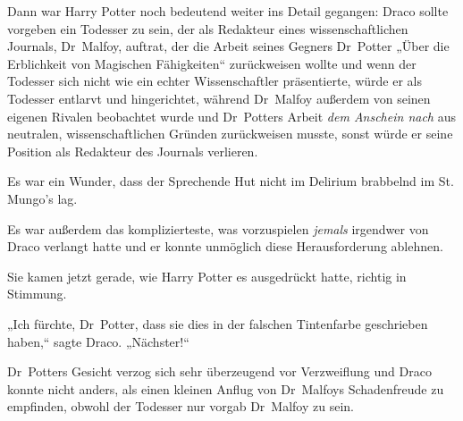 Dann war Harry Potter noch bedeutend weiter ins Detail gegangen: Draco sollte vorgeben ein Todesser zu sein, der als Redakteur eines wissenschaftlichen Journals, Dr~Malfoy, auftrat, der die Arbeit seines Gegners Dr~Potter „Über die Erblichkeit von Magischen Fähigkeiten“ zurückweisen wollte und wenn der Todesser sich nicht wie ein echter Wissenschaftler präsentierte, würde er als Todesser entlarvt und hingerichtet, während Dr~Malfoy außerdem von seinen eigenen Rivalen beobachtet wurde und Dr~Potters Arbeit \emph{dem Anschein nach} aus neutralen, wissenschaftlichen Gründen zurückweisen musste, sonst würde er seine Position als Redakteur des Journals verlieren.

Es war ein Wunder, dass der Sprechende Hut nicht im Delirium brabbelnd im St. Mungo's lag.

Es war außerdem das komplizierteste, was vorzuspielen \emph{jemals} irgendwer von Draco verlangt hatte und er konnte unmöglich diese Herausforderung ablehnen.

Sie kamen jetzt gerade, wie Harry Potter es ausgedrückt hatte, richtig in Stimmung.

„Ich fürchte, Dr~Potter, dass sie dies in der falschen Tintenfarbe geschrieben haben,“ sagte Draco. „Nächster!“

Dr~Potters Gesicht verzog sich sehr überzeugend vor Verzweiflung und Draco konnte nicht anders, als einen kleinen Anflug von Dr~Malfoys Schadenfreude zu empfinden, obwohl der Todesser nur vorgab Dr~Malfoy zu sein.

